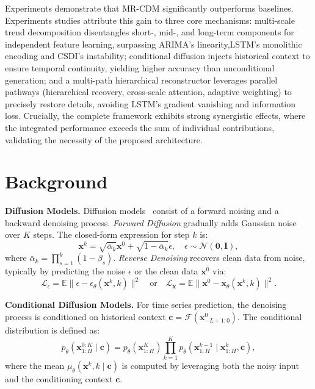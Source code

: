 Experiments demonstrate that MR-CDM significantly outperforms baselines. Experiments studies attribute this gain to three core mechanisms: multi-scale trend decomposition disentangles short-, mid-, and long-term components for independent feature learning, surpassing ARIMA’s linearity,LSTM’s monolithic encoding and CSDI's instability; conditional diffusion injects historical context to ensure temporal continuity, yielding higher accuracy than unconditional generation; and a multi-path hierarchical reconstructor leverages parallel pathways (hierarchical recovery, cross-scale attention, adaptive weighting) to precisely restore details, avoiding LSTM’s gradient vanishing and information loss. Crucially, the complete framework exhibits strong synergistic effects, where the integrated performance exceeds the sum of individual contributions, validating the necessity of the proposed architecture.

\section{Background}\label{sec:background}

\textbf{Diffusion Models.}
Diffusion models~\cite{NEURIPS2020_4c5bcfec} consist of a forward noising and a backward denoising process. 
\textit{Forward Diffusion} gradually adds Gaussian noise over $K$ steps. The closed-form expression for step $k$ is:
\begin{equation}
    \mathbf{x}^k = \sqrt{\bar{\alpha}_k}\mathbf{x}^0 + \sqrt{1-\bar{\alpha}_k}\epsilon, \quad \epsilon \sim \mathcal{N}(\mathbf{0},\mathbf{I}),
\end{equation}
where $\bar{\alpha}_k = \prod_{s=1}^k (1-\beta_s)$.
\textit{Reverse Denoising} recovers clean data from noise, typically by predicting the noise $\epsilon$ or the clean data $\mathbf{x}^0$ via:
\begin{equation}
    \mathcal{L}_\epsilon = \mathbb{E} \|\epsilon - \epsilon_\theta(\mathbf{x}^k, k)\|^2 \quad \text{or} \quad \mathcal{L}_{\mathbf{x}} = \mathbb{E} \|\mathbf{x}^0 - \mathbf{x}_\theta(\mathbf{x}^k, k)\|^2.
\end{equation}

\textbf{Conditional Diffusion Models.}
For time series prediction, the denoising process is conditioned on historical context $\mathbf{c} = \mathcal{F}(\mathbf{x}_{-L+1:0}^0)$. The conditional distribution is defined as:
\begin{equation}
    p_\theta(\mathbf{x}_{1:H}^{0:K} \mid \mathbf{c}) = p_\theta(\mathbf{x}_{1:H}^K) \prod_{k=1}^K p_\theta(\mathbf{x}_{1:H}^{k-1} \mid \mathbf{x}_{1:H}^k, \mathbf{c}),
\end{equation}
where the mean $\mu_\theta(\mathbf{x}^k, k \mid \mathbf{c})$ is computed by leveraging both the noisy input and the conditioning context $\mathbf{c}$.

